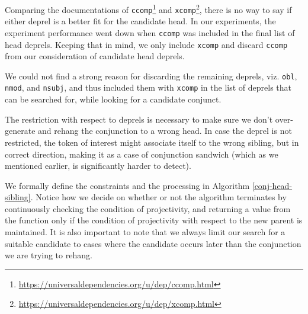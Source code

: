 Comparing the documentations of \texttt{ccomp}\footnote{\url{https://universaldependencies.org/u/dep/ccomp.html}} and \texttt{xcomp}\footnote{\url{https://universaldependencies.org/u/dep/xcomp.html}}, there is no way to say if either deprel is a better fit for the candidate head. In our experiments, the experiment performance went down when \texttt{ccomp} was included in the final list of head deprels. Keeping that in mind, we only include \texttt{xcomp} and discard \texttt{ccomp} from our consideration of candidate head deprels.

We could not find a strong reason for discarding the remaining deprels, viz. \verb|obl|, \verb|nmod|, and \verb|nsubj|, and thus included them with \verb|xcomp| in the list of deprels that can be searched for, while looking for a candidate conjunct.

The restriction with respect to deprels is necessary to make sure we don't over-generate and rehang the conjunction to a wrong head. In case the deprel is not restricted, the token of interest might associate itself to the wrong sibling, but in correct direction, making it as a case of conjunction sandwich (which as we mentioned earlier, is significantly harder to detect).

We formally define the constraints and the processing in Algorithm \ref{conj-head-sibling}. Notice how we decide on whether or not the algorithm terminates by continuously checking the condition of projectivity, and returning a value from the function only if the condition of projectivity with respect to the new parent is maintained. It is also important to note that we always limit our search for a suitable candidate to cases where the candidate occurs later than the conjunction we are trying to rehang.

